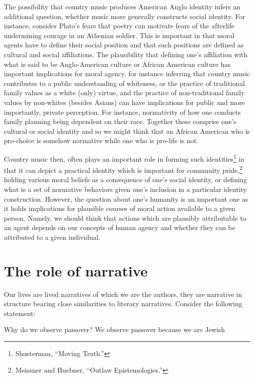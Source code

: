 \documentclass[phdthesis,12pt,final]{wuthesis}
\theoremstyle{definition}
\theoremstyle{definition}
\theoremstyle{definition}
\theoremstyle{definition}
\theoremstyle{remark}
\begin{document}
The possibility that country music produces American Anglo identity infers an additional question, whether music more generally constructs social identity. For instance, consider Plato's fears that poetry can motivate fears of the afterlife undermining courage in an Athenian soldier. This is important in that moral agents have to define their social position and that such positions are defined as cultural and social affiliations. The plausibility that defining one's affiliation with what is said to be Anglo-American culture or African American culture has important implications for moral agency, for instance inferring that country music contributes to a public understanding of whiteness, or the practice of traditional family values as a white (only) virtue, and the practice of non-traditional family values by non-whites (besides Asians) can have implications for public and more importantly, private perception. For instance, normativity of how one conducts family planning being dependent on their race. Together these comprise one's cultural or social identity and so we might think that an African American who is pro-choice is somehow normative while one who is pro-life is not.

Country music then, often plays an important role in forming such identities\footnote{Shusterman, {``Moving {Truth}.''}} in that it can depict a practical identity which is important for community pride,\footnote{Meissner and Huebner, {``Outlaw Epistemologies.''}} holding various moral beliefs as a consequence of one's social identity, or defining what is a set of normative behaviors given one's inclusion in a particular identity construction. However, the question about one's humanity is an important one as it holds implications for plausible courses of moral action available to a given person. Namely, we should think that actions which are plausibly attributable to an agent depends on our concepts of human agency and whether they can be attributed to a given individual.

\section{The role of narrative}\label{the-role-of-narrative}

Our lives are lived narratives of which we are the authors, they are narrative in structure bearing close similarities to literary narratives. Consider the following statement:

Why do we observe passover? We observe passover because we are Jewish
\end{document}
